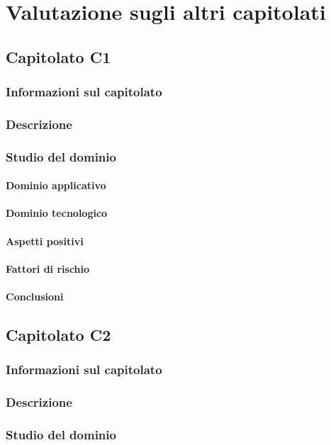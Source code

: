 \section{Valutazione sugli altri capitolati}
	\subsection{Capitolato C1}
		\subsubsection{Informazioni sul capitolato}
		\subsubsection{Descrizione}
		\subsubsection{Studio del dominio}
			\paragraph{Dominio applicativo}
			\paragraph{Dominio tecnologico}
			\paragraph{Aspetti positivi}
			\paragraph{Fattori di rischio}
			\paragraph{Conclusioni}
			
			
	\subsection{Capitolato C2}
	\subsubsection{Informazioni sul capitolato}
	\subsubsection{Descrizione}
	\subsubsection{Studio del dominio}
